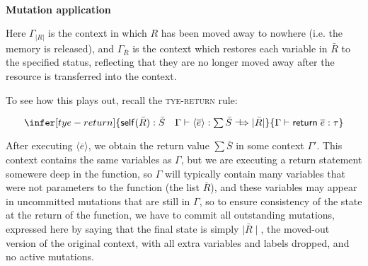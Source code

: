 \documentclass[acmsmall,nonacm]{acmart}
\newcommand{\core}[1]{{\mid}#1{\mid}}
\newcommand{\proves}{\vdash}
\newcommand{\constep}{\Rightarrow}
\newcommand{\makesto}{\dashv\!\constep}
\newcommand{\judgment}[2][]{\noindent\\\textbf{#1}\hspace{\stretch{1}}\fbox{$#2$}\nopagebreak}
\newcommand*{\axiom}[2][]{\infer[#1]{}{#2}}
\begin{document}
\judgment[Mutation application]{\Gamma \constep\Gamma'}
Here $\Gamma_{|R|}$ is the context in which $R$ has been moved away to nowhere (i.e. the memory is released), and $\Gamma_{\bar R}$ is the context which restores each variable in $\bar R$ to the specified status, reflecting that they are no longer moved away after the resource is transferred into the context.

To see how this plays out, recall the \textsc{tye-return} rule:

$$\infer[tye-return]
    {\mathsf{self}(\bar R):\bar S\quad
      \Gamma \proves \langle\overline{e}\rangle:\textstyle\sum\bar S\makesto \core{\bar R}}
    {\Gamma \proves \mathsf{return}\;\overline{e}:\tau}$$

After executing $\langle\overline{e}\rangle$, we obtain the return value $\sum\bar S$ in some context $\Gamma'$. This context contains the same variables as $\Gamma$, but we are executing a return statement somewere deep in the function, so $\Gamma$ will typically contain many variables that were not parameters to the function (the list $\bar R$), and these variables may appear in uncommitted mutations that are still in $\Gamma$, so to ensure consistency of the state at the return of the function, we have to commit all outstanding mutations, expressed here by saying that the final state is simply $\core{\bar R}$, the moved-out version of the original context, with all extra variables and labels dropped, and no active mutations.
\end{document}
